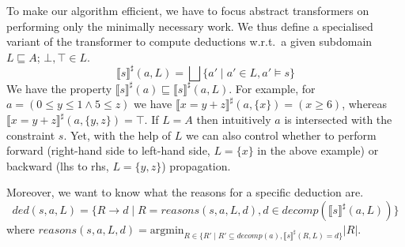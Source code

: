 To make our algorithm efficient, we have to focus abstract
transformers on performing only the minimally necessary
work. 
%
We thus define a specialised variant of the transformer to compute
deductions w.r.t.\ a given subdomain $L\sqsubseteq A$; $\bot,\top \in L$.
\[\llbracket s \rrbracket^\sharp(a,L)=\bigsqcup \{a'\mid a'\in L, a'\models s\}\]
We have the property $\llbracket s \rrbracket^\sharp(a)\sqsubseteq \llbracket s \rrbracket^\sharp(a,L)$.
%
For example, for
$a=(0\leq y \leq 1 \wedge 5\leq z)$ we have
$\llbracket x=y+z\rrbracket^\sharp(a,\{x\})=(x\geq 6)$, whereas
$\llbracket x=y+z\rrbracket^\sharp(a,\{y,z\})=\top$.
%
If $L=A$ then intuitively $a$ is intersected with the constraint $s$.
Yet, with the help of $L$ we can also control whether to perform
forward (right-hand side to left-hand side, $L=\{x\}$ in the above
example) or backward (lhs to rhs, $L=\{y,z\}$) propagation.

Moreover, we want to know what the reasons for a specific deduction are.
\[ded(s,a,L)=\{R\rightarrow d\mid R=reasons(s,a,L,d), d \in decomp(\llbracket s \rrbracket^\sharp(a,L))\}\]
where 
$reasons(s,a,L,d)=\text{argmin}_{R\in\{R'\mid R'\subseteq decomp(a), \llbracket s\rrbracket^\sharp(R,L)=d\}} |R| $.




